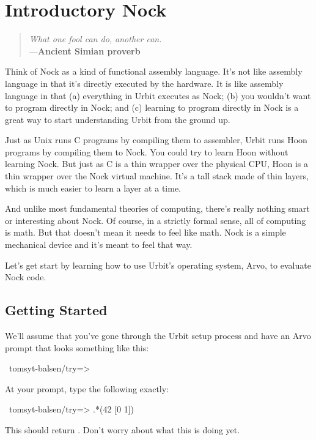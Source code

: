 \chapter{Introductory Nock}

\begin{quote}
\noindent \emph{What one fool can do, another can.}
\medskip \\
\noindent ---\textbf{Ancient Simian proverb}
\end{quote}

Think of Nock as a kind of functional assembly language.  It's not like
assembly language in that it's directly executed by the hardware.  It is like
assembly language in that (a) everything in Urbit executes as Nock; (b) you
wouldn't want to program directly in Nock; and (c) learning to program directly
in Nock is a great way to start understanding Urbit from the ground up.

Just as Unix runs C programs by compiling them to assembler, Urbit runs Hoon
programs by compiling them to Nock.  You could try to learn Hoon without
learning Nock.  But just as C is a thin wrapper over the physical CPU, Hoon is
a thin wrapper over the Nock virtual machine.  It's a tall stack made of thin
layers, which is much easier to learn a layer at a time.

And unlike most fundamental theories of computing, there's really nothing smart
or interesting about Nock.  Of course, in a strictly formal sense, all of
computing is math.  But that doesn't mean it needs to feel like math.  Nock is
a simple mechanical device and it's meant to feel that way.

Let's get start by learning how to use Urbit's operating system, Arvo, to
evaluate Nock code.

\section{Getting Started}

\label{sec:getting_started}

We'll assume that you've gone through the Urbit setup process and have an Arvo
prompt that looks something like this:

\begin{code}
~tomsyt-balsen/try=>
\end{code}

At your prompt, type the following exactly:
\begin{code}
~tomsyt-balsen/try=> .*(42 [0 1])
\end{code}
This should return . Don't worry about what this is doing yet.

